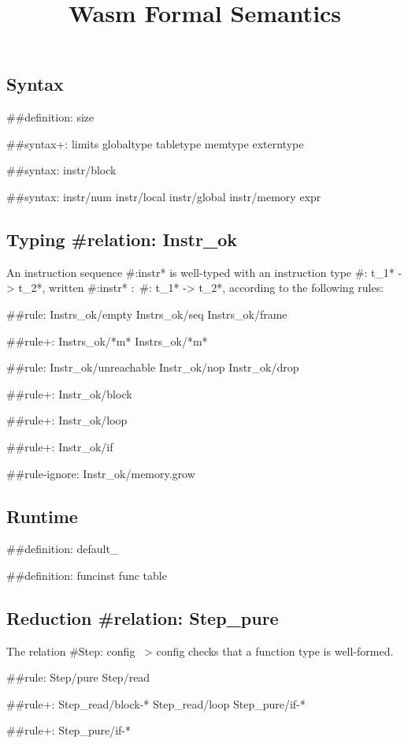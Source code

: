 \documentclass[a4paper]{scrartcl}
\title{Wasm Formal Semantics}
\begin{document}
\small

\maketitle


\subsection*{Syntax}

##{definition: size}

##{syntax+:
  limits
  {globaltype
  tabletype
  memtype}
  {}
  externtype
}

##{syntax: {instr/block}}

##{syntax: {instr/num instr/local instr/global instr/memory} expr}


\subsection*{Typing #{relation: Instr_ok}}

An instruction sequence #{:instr*} is well-typed with an instruction type #{: t_1* -> t_2*}, written #{:instr*} $:$ #{: t_1* -> t_2*}, according to the following rules:

##{rule:
  {Instrs_ok/empty Instrs_ok/seq}
  {Instrs_ok/frame}
}

##{rule+: Instrs_ok/*m* {Instrs_ok/*m*}}

##{rule: {Instr_ok/unreachable Instr_ok/nop Instr_ok/drop}}

##{rule+: Instr_ok/block}

##{rule+: Instr_ok/loop}

##{rule+: Instr_ok/if}


##{rule-ignore: Instr_ok/memory.grow}


\subsection*{Runtime}

##{definition: default_}

##{definition: {funcinst} {func table}}


\subsection*{Reduction #{relation: Step_pure}}

The relation #{Step: config ~> config} checks that a function type is well-formed.

##{rule: Step/pure Step/read}

##{rule+: {Step_read/block-* Step_read/loop} {Step_pure/if-*}}

##{rule+: Step_pure/if-*}
\end{document}
